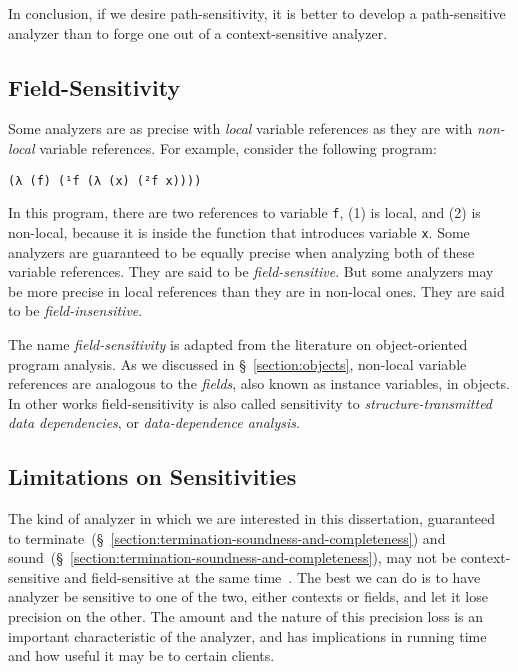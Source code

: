 \documentclass[12pt, oneside]{book}
\begin{document}
In conclusion, if we desire path-sensitivity, it is better to develop a path-sensitive analyzer than to forge one out of a context-sensitive analyzer.

\subsection{Field-Sensitivity}
\label{section:field-sensitivity}

Some analyzers are as precise with \emph{local} variable references as they are with \emph{non-local} variable references. For example, consider the following program:

\begin{Verbatim}
(λ (f) (¹f (λ (x) (²f x))))
\end{Verbatim}

In this program, there are two references to variable \texttt{f}, (1) is local, and (2) is non-local, because it is inside the function that introduces variable \texttt{x}. Some analyzers are guaranteed to be equally precise when analyzing both of these variable references. They are said to be \emph{field-sensitive}. But some analyzers may be more precise in local references than they are in non-local ones. They are said to be \emph{field-insensitive}.

The name \emph{field-sensitivity} is adapted from the literature on object-oriented program analysis. As we discussed in §~\ref{section:objects}, non-local variable references are analogous to the \emph{fields}, also known as instance variables, in objects. In other works field-sensitivity is also called sensitivity to \emph{structure-transmitted data dependencies}, or \emph{data-dependence analysis}.

\subsection{Limitations on Sensitivities}

The kind of analyzer in which we are interested in this dissertation, guaranteed to terminate~(§~\ref{section:termination-soundness-and-completeness}) and sound~(§~\ref{section:termination-soundness-and-completeness}), may not be context-sensitive and field-sensitive at the same time~\cite{reps-2000}. The best we can do is to have analyzer be sensitive to one of the two, either contexts or fields, and let it lose precision on the other. The amount and the nature of this precision loss is an important characteristic of the analyzer, and has implications in running time and how useful it may be to certain clients.
\end{document}
